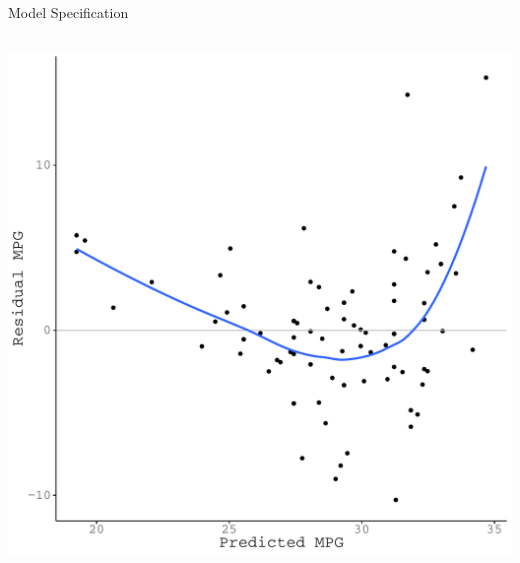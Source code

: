\documentclass{beamer}\usepackage[]{graphicx}\usepackage[]{color}
\makeatletter
\def\maxwidth{ %
  \ifdim\Gin@nat@width>\linewidth
    \linewidth
  \else
    \Gin@nat@width
  \fi
}
\newenvironment{knitrout}{}{} %
\makeatother
\begin{document}
\begin{frame}{Model Specification}
\begin{columns}
\begin{column}{0.5\textwidth}
\begin{knitrout}
{\centering \includegraphics[width=\maxwidth]{figure/unnamed-chunk-13-1} 

}



\end{knitrout}

\end{column}
\end{columns}
  
\end{frame}

\end{document}
